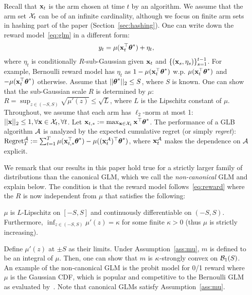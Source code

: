 Recall that $\mathbf{x}_t$ is the arm chosen at time $t$ by an algorithm.
We assume that the arm set $\mathcal{X}_t$ can be of an infinite cardinality, although we focus on finite arm sets in hashing part of the paper (Section~\ref{sec:hashing}).
One can write down the reward model~\eqref{eq:glm} in a different form:
\vspace{-4pt}
\begin{equation}\begin{aligned}\label{eq:reward}
   y_t = \mu( \mathbf{x}_t^{\top}{{\boldsymbol \theta}}^* ) + \eta_t,
\end{aligned}\end{equation}
where $\eta_t$ is conditionally $R$-sub-Gaussian given $\mathbf{x}_t$ and $\{(\mathbf{x}_s,\eta_s)\}_{s=1}^{t-1}$.
For example, Bernoulli reward model has $\eta_t$ as $1-\mu(\mathbf{x}_t^{\top}{{\boldsymbol \theta}}^*)$ w.p. $\mu(\mathbf{x}_t^{\top}{{\boldsymbol \theta}}^*)$ and $-\mu(\mathbf{x}_t^{\top}{{\boldsymbol \theta}}^*)$ otherwise.
Assume that $||{{\boldsymbol \theta}}^*||_2 \le S$, where $S$ is known. 
One can show that the sub-Gaussian scale $R$ is determined by $\mu$: $R = \sup_{z\in(-S,S)} \sqrt{\mu'(z)} \le \sqrt{L}$, where $L$ is the Lipschitz constant of $\mu$.
Throughout, we assume that each arm has $\ell_2$-norm at most 1: $||\mathbf{x}||_2 \le 1, \forall \mathbf{x}\in \mathcal{X}_t, \forall t$. 
Let $\mathbf{x}_{t,*} := \max_{\mathbf{x}\in\mathcal{X}_t} \mathbf{x}^{\top}{{\boldsymbol \theta}}^*$.
The performance of a GLB algorithm $\mathcal{A}$ is analyzed by the expected cumulative regret (or simply \emph{regret}): $\text{Regret}^\mathcal{A}_T := \sum_{t=1}^T \mu( \mathbf{x}_{t,*}^{\top}{{\boldsymbol \theta}}^* ) - \mu( (\mathbf{x}^\mathcal{A}_t)^{\top}{{\boldsymbol \theta}}^* ) $, where $\mathbf{x}^\mathcal{A}_t$ makes the dependence on $\mathcal{A}$ explicit.

We remark that our results in this paper hold true for a strictly larger family of distributions than the canonical GLM, which we call the \emph{non-canonical} GLM and explain below.
The condition is that the reward model follows~\eqref{eq:reward} where the $R$ is now independent from $\mu$ that satisfies the following:
\begin{ass} \label{ass:mu}
  $\mu$ is $L$-Lipschitz on $[-S,S]$ and continuously differentiable on $(-S,S)$.
  Furthermore, $\inf_{z \in (-S,S)} \mu'(z) = \kappa$ for some finite $\kappa>0$ (thus $\mu$ is strictly increasing).
\end{ass}
Define $\mu'(z)$ at $\pm S$ as their limits.
Under Assumption~\ref{ass:mu}, $m$ is defined to be an integral of $\mu$.
Then, one can show that $m$ is ${\kappa}$-strongly convex on $\mathcal{B}_1(S)$.
An example of the non-canonical GLM is the probit model for 0/1 reward where $\mu$ is the Gaussian CDF, which is popular and competitive to the Bernoulli GLM as evaluated by~\citet{li12anunbiased}.
Note that canonical GLMs satisfy Assumption~\ref{ass:mu}. 

